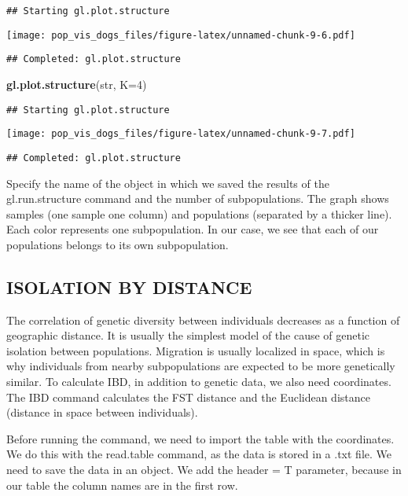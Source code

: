 \documentclass[
]{article}
\newenvironment{Shaded}{\begin{snugshade}}{\end{snugshade}}
\newcommand{\AttributeTok}[1]{\textcolor[rgb]{0.13,0.29,0.53}{#1}}
\newcommand{\DecValTok}[1]{\textcolor[rgb]{0.00,0.00,0.81}{#1}}
\newcommand{\FunctionTok}[1]{\textcolor[rgb]{0.13,0.29,0.53}{\textbf{#1}}}
\newcommand{\NormalTok}[1]{#1}
\begin{document}
\begin{verbatim}
## Starting gl.plot.structure
\end{verbatim}

\texttt{[image: pop\_vis\_dogs\_files/figure-latex/unnamed-chunk-9-6.pdf]}

\begin{verbatim}
## Completed: gl.plot.structure
\end{verbatim}

\begin{Shaded}
\begin{Highlighting}[]
\FunctionTok{gl.plot.structure}\NormalTok{(str, }\AttributeTok{K=}\DecValTok{4}\NormalTok{)}
\end{Highlighting}
\end{Shaded}

\begin{verbatim}
## Starting gl.plot.structure
\end{verbatim}

\texttt{[image: pop\_vis\_dogs\_files/figure-latex/unnamed-chunk-9-7.pdf]}

\begin{verbatim}
## Completed: gl.plot.structure
\end{verbatim}

Specify the name of the object in which we saved the results of the
gl.run.structure command and the number of subpopulations. The graph
shows samples (one sample one column) and populations (separated by a
thicker line). Each color represents one subpopulation. In our case, we
see that each of our populations belongs to its own subpopulation.

\subsection{ISOLATION BY DISTANCE}\label{isolation-by-distance}

The correlation of genetic diversity between individuals decreases as a
function of geographic distance. It is usually the simplest model of the
cause of genetic isolation between populations. Migration is usually
localized in space, which is why individuals from nearby subpopulations
are expected to be more genetically similar. To calculate IBD, in
addition to genetic data, we also need coordinates. The IBD command
calculates the FST distance and the Euclidean distance (distance in
space between individuals).

Before running the command, we need to import the table with the
coordinates. We do this with the read.table command, as the data is
stored in a .txt file. We need to save the data in an object. We add the
header = T parameter, because in our table the column names are in the
first row.
\end{document}
